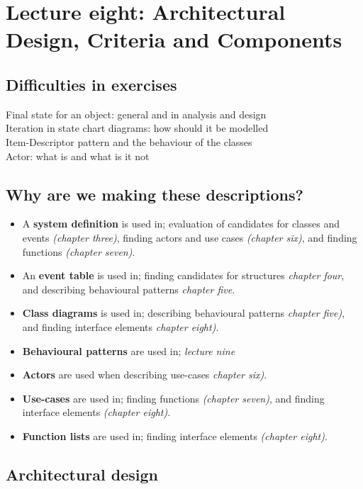 \chapter{Lecture eight: Architectural Design, Criteria and Components}

\section{Difficulties in exercises}
Final state for an object: general and in analysis and design \\
Iteration in state chart diagrams: how should it be modelled \\
Item-Descriptor pattern and the behaviour of the classes \\ 
Actor: what is and what is it not \\

\section{Why are we making these descriptions?}
\begin{itemize}
    \item A \textbf{system definition} is used in; evaluation of candidates for classes and events \textit{(chapter three)}, finding actors and use cases \textit{(chapter six)}, and finding functions \textit{(chapter seven)}.
    \item An \textbf{event table} is used in; finding candidates for structures \textit{chapter four}, and describing behavioural patterns \textit{chapter five}.
    \item \textbf{Class diagrams} is used in; describing behavioural patterns \textit{chapter five)}, and finding interface elements \textit{chapter eight)}.
    \item \textbf{Behavioural patterns} are used in; \textit{lecture nine}
    \item \textbf{Actors} are used when describing use-cases \textit{chapter six)}.
    \item \textbf{Use-cases} are used in; finding functions \textit{(chapter seven)}, and finding interface elements \textit{(chapter eight)}.
    \item \textbf{Function lists} are used in; finding interface elements \textit{(chapter eight)}.
\end{itemize}

\section{Architectural design}
